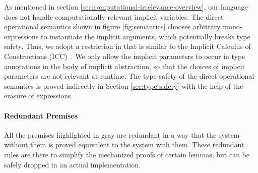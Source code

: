As mentioned in section \ref{sec:computational-irrelevance-overview}, our language
does not handle computationally relevant implicit variables.
The direct operational semantics shown in figure \ref{fig:semantics} chooses
arbitrary mono-expressions to instantiate the implicit arguments,
which potentially breaks type safety.
Thus, we adopt a restriction in  that is similar to the
Implicit Calculus of Constructions (ICC)~\cite{miquel2001implicit}.
We only allow the implicit parameters to occur in type annotations in the
body of implicit abstraction, so that the choices of implicit parameters are not
relevant at runtime. The type safety of the direct operational semantics is
proved indirectly in Section \ref{sec:type-safety} with the help of the
erasure of expressions.

\paragraph{Redundant Premises}

All the premises highlighted in gray are redundant in a way that
the system without them is proved equivalent to the system with them.
These redundant rules are there to simplify the mechanized proofs of
certain lemmas, but can be safely dropped in an actual implementation.

